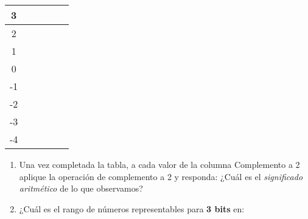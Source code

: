 \documentclass[12pt]{article}
\begin{document}
\begin{enumerate}
\begin{center}
\begin{tabular}[t]{|c|c|c|c|}
            \hline

                3 & \hspace{9em}~&\hspace{9em}~&\hspace{9em}~\\

            \hline

                2&&&\\

            \hline

                1&&&\\

            \hline

                0&&&\\

            \hline

                -1&&&\\

            \hline

                -2&&&\\

            \hline

                -3&&&\\

            \hline

                -4&&&\\

            \hline

            \end{tabular}

        \end{center}

        \begin{enumerate}

            \item Una vez completada la tabla, a cada valor de la columna
                Complemento a 2 aplique la operación de complemento a 2 y
                responda: ¿Cuál es el \emph{significado aritmético} de lo que
                observamos?

            \item ¿Cuál es el rango de números representables para \textbf{3
                bits} en:

\end{enumerate}
\end{enumerate}
\end{document}
